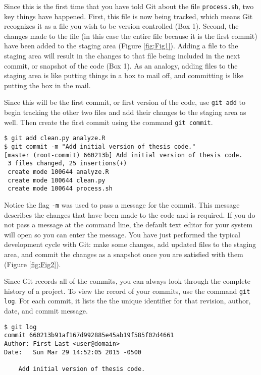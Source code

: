 Since this is the first time that you have told Git about the file \verb|process.sh|, two key things have happened.
First, this file is now being tracked, which means Git recognizes it as a file you wish to be version controlled (Box 1).
Second, the changes made to the file (in this case the entire file because it is the first commit) have been added to the staging area (Figure \ref{fig:Fig1}).
Adding a file to the staging area will result in the changes to that file being included in the next commit, or snapshot of the code (Box 1).
As an analogy, adding files to the staging area is like putting things in a box to mail off, and committing is like putting the box in the mail.

Since this will be the first commit, or first version of the code, use \verb|git add| to begin tracking the other two files and add their changes to the staging area as well.
Then create the first commit using the command \verb|git commit|.

\begin{verbatim}
$ git add clean.py analyze.R
$ git commit -m "Add initial version of thesis code."
[master (root-commit) 660213b] Add initial version of thesis code.
 3 files changed, 25 insertions(+)
 create mode 100644 analyze.R
 create mode 100644 clean.py
 create mode 100644 process.sh
\end{verbatim}

Notice the flag \verb|-m| was used to pass a message for the commit.
This message describes the changes that have been made to the code and is required.
If you do not pass a message at the command line, the default text editor for your system will open so you can enter the message.
You have just performed the typical development cycle with Git:
make some changes, add updated files to the staging area, and commit the changes as a snapshot once you are satisfied with them (Figure \ref{fig:Fig2}).

Since Git records all of the commits, you can always look through the complete history of a project.
To view the record of your commits, use the command \verb|git log|.
For each commit, it lists the the unique identifier for that revision, author, date, and commit message.

\begin{verbatim}
$ git log
commit 660213b91af167d992885e45ab19f585f02d4661
Author: First Last <user@domain>
Date:   Sun Mar 29 14:52:05 2015 -0500

    Add initial version of thesis code.
\end{verbatim}

